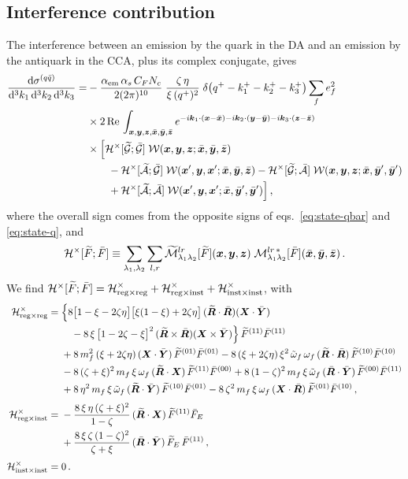 \subsection{Interference contribution}
\label{sec:xs-int}

The interference between an emission by the quark in the DA and an emission by the antiquark in the
CCA, plus its complex conjugate, gives
\begin{align}
\frac{{\rm d}\sigma^{(q\bar q)}}{{\rm d}^3k_1\,{\rm d}^3k_2\,{\rm d}^3k_3}=&
-\frac{\alpha_{\rm em}\,\alpha_s\,C_FN_c}{2(2\pi)^{10}}\;\frac{\zeta\,\eta}{\xi\,(q^+)^2}\;
\delta\big(q^+-k_1^+-k_2^+-k_3^+\big)\sum_fe_f^2
\nonumber\\
&\times2\,{\rm Re}\,\int_{\bm{x},\bm{y},\bm{z},\bar{\bm{x}},\bar{\bm{y}},\bar{\bm{z}}}e^{-i\bm{k}_1\cdot(\bm{x}-\bar{\bm{x}})-i\bm{k}_2\cdot(\bm{y}-\bar{\bm{y}})-i\bm{k}_3\cdot(\bm{z}-\bar{\bm{z}})}
\nonumber\\
&\times\Big[\mathcal{H}^\times[\widetilde{\mathcal{G}};\bar{\mathcal{G}}]\;\mathcal{W}(\bm{x},\bm{y},\bm{z};\bar{\bm{x}},\bar{\bm{y}},\bar{\bm{z}})
\nonumber\\
&\qquad-\mathcal{H}^\times[\widetilde{\mathcal{A}};\bar{\mathcal{G}}]\;\mathcal{W}(\bm{x}',\bm{y},\bm{x}';\bar{\bm{x}},\bar{\bm{y}},\bar{\bm{z}})
-\mathcal{H}^\times[\widetilde{\mathcal{G}};\bar{\mathcal{A}}]\;\mathcal{W}(\bm{x},\bm{y},\bm{z};\bar{\bm{x}},\bar{\bm{y}}',\bar{\bm{y}}')
\nonumber\\
&\qquad+\mathcal{H}^\times[\widetilde{\mathcal{A}};\bar{\mathcal{A}}]\;\mathcal{W}(\bm{x}',\bm{y},\bm{x}';\bar{\bm{x}},\bar{\bm{y}}',\bar{\bm{y}}')\Big]\,,
\label{eq:xs-int}
\end{align}
where the overall sign comes from the opposite signs of eqs.~\eqref{eq:state-qbar} and
\eqref{eq:state-q}, and
\begin{equation}
\mathcal{H}^\times[\widetilde{F};\bar F]\equiv\sum_{\lambda_1,\lambda_2}\sum_{l,r}\widetilde{\mathcal{M}}^{lr}_{\lambda_1\lambda_2}[\widetilde{F}](\bm{x},\bm{y},\bm{z})\;
\mathcal{M}^{lr\,*}_{\lambda_1\lambda_2}[\bar F](\bar{\bm{x}},\bar{\bm{y}},\bar{\bm{z}})\,.
\end{equation}
We find $\mathcal{H}^\times[\widetilde{F};\bar F]=\mathcal{H}^\times_{\rm reg\times reg}+\mathcal{H}^\times_{\rm reg\times inst}
+\mathcal{H}^\times_{\rm inst\times inst}$, with
\begin{subequations}
\label{eq:Hx}
\begin{align}
\mathcal{H}^\times_{\rm reg\times reg}={}&\Big\{8\big[1-\xi-2\zeta\eta\big]\big[\xi(1-\xi)+2\zeta\eta\big]\,
(\widetilde{\bm{R}}\cdot\bar{\bm{R}})(\bm{X}\cdot\bar{\bm{Y}})
\nonumber\\
&\quad-8\,\xi\,\big[1-2\zeta-\xi\big]^2\,(\widetilde{\bm{R}}\times\bar{\bm{R}})(\bm{X}\times\bar{\bm{Y}})\Big\}\,\widetilde{F}^{(11)}\bar F^{(11)}
\nonumber\\
&+8\,m_f^2\,(\xi+2\zeta\eta)\,(\bm{X}\cdot\bar{\bm{Y}})\,\widetilde{F}^{(01)}\bar F^{(01)}
-8\,(\xi+2\zeta\eta)\,\xi^2\,\tilde{\omega}_f\,\omega_f\,(\widetilde{\bm{R}}\cdot\bar{\bm{R}})\,\widetilde{F}^{(10)}\bar F^{(10)}
\nonumber\\
&-8\,(\zeta+\xi)^2\,m_f\,\xi\,\omega_f\,(\widetilde{\bm{R}}\cdot\bm{X})\,\widetilde{F}^{(11)}\bar F^{(00)}
+8\,(1-\zeta)^2\,m_f\,\xi\,\tilde{\omega}_f\,(\bar{\bm{R}}\cdot\bar{\bm{Y}})\,\widetilde{F}^{(00)}\bar F^{(11)}
\nonumber\\
&+8\,\eta^2\,m_f\,\xi\,\tilde{\omega}_f\,(\widetilde{\bm{R}}\cdot\bar{\bm{Y}})\,\widetilde{F}^{(10)}\bar F^{(01)}
-8\,\zeta^2\,m_f\,\xi\,\omega_f\,(\bm{X}\cdot\bar{\bm{R}})\,\widetilde{F}^{(01)}\bar F^{(10)}\,,
\label{eq:Hxrr}\\[1mm]
\mathcal{H}^\times_{\rm reg\times inst}={}&-\frac{8\,\xi\,\eta\,(\zeta+\xi)^2}{1-\zeta}\,
(\widetilde{\bm{R}}\cdot\bm{X})\,\widetilde{F}^{(11)}\bar F_E
\nonumber\\
&+\frac{8\,\xi\,\zeta\,(1-\zeta)^2}{\zeta+\xi}\,(\bar{\bm{R}}\cdot\bar{\bm{Y}})\,\widetilde{F}_E\,\bar F^{(11)}\,,
\label{eq:Hxri}\\[1mm]
\mathcal{H}^\times_{\rm inst\times inst}={}&0\,.
\label{eq:Hxii}
\end{align}
\end{subequations}
